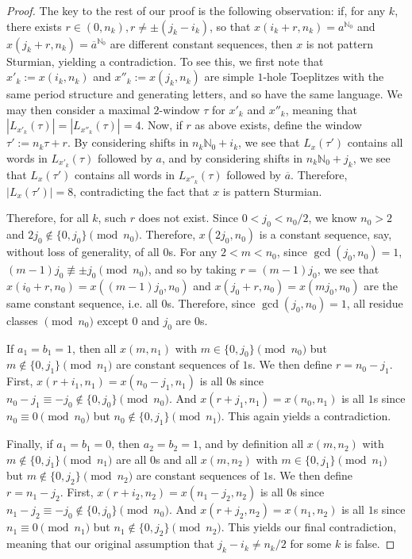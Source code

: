 \documentclass[11pt,reqno]{amsart}
\theoremstyle{definition}
\theoremstyle{plain}
\newcommand{\N}{\mathbb{N}}
\begin{document}
\begin{proof}
The key to the rest of our proof is the following observation: if, for any $k$, there exists $r \in (0, n_k), r \neq \pm(j_k - i_k)$, so that $x(i_k + r, n_k) = a^{\N_0}$ and $x(j_k + r, n_k) = \overline{a}^{\N_0}$ are different constant sequences, then $x$ is not pattern Sturmian, yielding a contradiction. To see this, we first note that $x'_k := x(i_k, n_k)$ and $x''_k := x(j_k, n_k)$ are simple $1$-hole Toeplitzes with the same period structure and generating letters, and so have the same language. We may then consider a maximal $2$-window $\tau$ for $x'_k$ and $x''_k$, meaning that $|L_{x'_k}(\tau)| = |L_{x''_k}(\tau)| = 4$. Now, if $r$ as above exists, define the window $\tau' := n_k \tau + r$. By considering shifts in $n_k \mathbb{N}_0 + i_k$, we see that $L_x(\tau')$ contains all words in $L_{x'_k}(\tau)$ followed by $a$, and by considering shifts in $n_k \mathbb{N}_0 + j_k$, we see that $L_x(\tau')$ contains all words in $L_{x''_k}(\tau)$ followed by $\overline{a}$. Therefore, 
$|L_x(\tau')| = 8$, contradicting the fact that $x$ is pattern Sturmian.

Therefore, for all $k$, such $r$ does not exist. Since $0 < j_0 < n_0/2$, we know $n_0 > 2$ and $2j_0 \notin \{0,j_0\} \pmod{n_0}$. Therefore, $x(2j_0, n_0)$ is a constant sequence, say, without loss of generality, of all $0$s. For any $2 < m < n_0$, since $\gcd(j_0, n_0) = 1$, 
$(m-1)j_0 \not\equiv \pm j_0 \pmod{n_0}$, and so by taking $r = (m-1)j_0$, we see that $x(i_0 + r, n_0) = x((m-1)j_0, n_0)$ and 
$x(j_0 + r, n_0) = x(mj_0, n_0)$ are the same constant sequence, i.e. all $0$s. Therefore, since $\gcd(j_0, n_0) = 1$, all residue classes $\pmod{n_0}$ except $0$ and $j_0$ are $0$s.

If $a_1 = b_1 = 1$, then all $x(m, n_1)$ with $m \in \{0, j_0\} \pmod{n_0}$ but $m \notin \{0, j_1\} \pmod{n_1}$ are constant sequences of $1$s. We then define $r = n_0 - j_1$. First, $x(r + i_1, n_1) = x(n_0 - j_1, n_1)$ is all $0$s since $n_0 - j_1 \equiv -j_0 \notin \{0, j_0\} \pmod{n_0}$. And $x(r + j_1, n_1) = x(n_0, n_1)$ is all $1$s since $n_0 \equiv 0 \pmod{n_0}$ but $n_0 \notin \{0, j_1\} \pmod{n_1}$. This again yields a contradiction.

Finally, if $a_1 = b_1 = 0$, then $a_2 = b_2 = 1$, and by definition all $x(m, n_2)$ with $m \notin \{0, j_1\} \pmod{n_1}$ are all $0$s and all $x(m,n_2)$ with $m \in \{0, j_1\} \pmod{n_1}$ but $m \notin \{0, j_2\} \pmod{n_2}$ are constant sequences of $1$s.
We then define $r = n_1 - j_2$. First, $x(r + i_2, n_2) = x(n_1 - j_2, n_2)$ is all $0$s since $n_1 - j_2 \equiv -j_0 \notin \{0, j_0\} \pmod{n_0}$. And $x(r + j_2, n_2) = x(n_1, n_2)$ is all $1$s since $n_1 \equiv 0 \pmod{n_1}$ but $n_1 \notin \{0, j_2\} \pmod{n_2}$. This yields our final contradiction, meaning that our original assumption that $j_k - i_k \neq n_k/2$ for some $k$ is false.


\end{proof}
\end{document}
